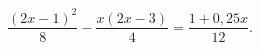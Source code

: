 \begin{ex}[type=equation]
	\begin{condition}
		$\dfrac{(2x - 1)^2}{8} - \dfrac{x(2x - 3)}{4} = \dfrac{1  + 0,25x}{12}.$
	\end{condition}
\end{ex}
